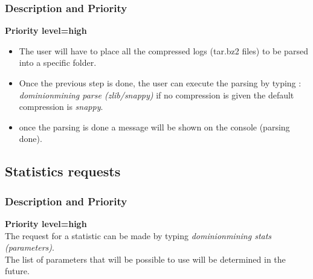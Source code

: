 \documentclass{scrreprt}
\begin{document}
\subsubsection{Description and Priority}
\textbf{Priority level=high}\\
\begin{itemize}
  \item The user will have to place all the compressed logs (tar.bz2 files) to be parsed into a
    specific folder.
  \item Once the previous step is done, the user can execute the parsing by
      typing : \textit{dominionmining parse (zlib/snappy)} if no compression is
      given the default compression is \textit{snappy}.
    \item once the parsing is done a message will be shown on the
      console (parsing done).
\end{itemize}


\subsection{Statistics requests}
\subsubsection{Description and Priority}
\textbf{Priority level=high}\\
The request for a statistic can be made by typing \textit{dominionmining stats (parameters)}.  \\
The list of parameters that will be possible to use will be determined in the
future.\\
\end{document}
